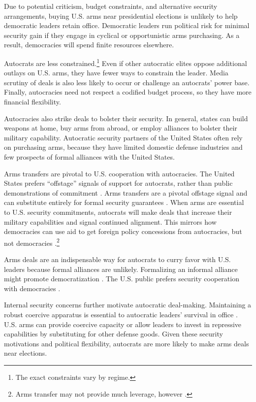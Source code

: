 \documentclass[12pt]{article}
\begin{document}
Due to potential criticism, budget constraints, and alternative security arrangements, buying U.S. arms near presidential elections is unlikely to help democratic leaders retain office.
Democratic leaders run political risk for minimal security gain if they engage in cyclical or opportunistic arms purchasing. 
As a result, democracies will spend finite resources elsewhere. 


Autocrats are less constrained.\footnote{The exact constraints vary by regime.}
Even if other autocratic elites oppose additional outlays on U.S. arms, they have fewer ways to constrain the leader.
Media scrutiny of deals is also less likely to occur or challenge an autocrats' power base. 
Finally, autocracies need not respect a codified budget process, so they have more financial flexibility.  


Autocracies also strike deals to bolster their security.
In general, states can build weapons at home, buy arms from abroad, or employ alliances to bolster their military capability. 
Autocratic security partners of the United States often rely on purchasing arms, because they have limited domestic defense industries and few prospects of formal alliances with the United States. 


Arms transfers are pivotal to U.S. cooperation with autocracies.  
The United States prefers ``offstage'' signals of support for autocrats, rather than public demonstrations of commitment \citep{McManusYarhi-Milo2017}.
Arms transfers are a pivotal offstage signal and can substitute entirely for formal security guarantees \citep{Yarhi-Miloetal2016}. 
When arms are essential to U.S. security commitments, autocrats will make deals that increase their military capabilities and signal continued alignment.
This mirrors how democracies can use aid to get foreign policy concessions from autocracies, but not democracies \citep{BDMSmith2009}.\footnote{Arms transfer may not provide much leverage, however \citep{Spindel2023}.}


Arms deals are an indispensable way for autocrats to curry favor with U.S. leaders because formal alliances are unlikely.  
Formalizing an informal alliance might promote democratization \citep{GiblerWolford2006}.
The U.S. public prefers security cooperation with democracies \citep{Alley2023}. 


Internal security concerns further motivate autocratic deal-making. 
Maintaining a robust coercive apparatus is essential to autocratic leaders' survival in office \citep{Boix2008}. 
U.S. arms can provide coercive capacity or allow leaders to invest in repressive capabilities by substituting for other defense goods. 
Given these security motivations and political flexibility, autocrats are more likely to make arms deals near elections.
\end{document}
